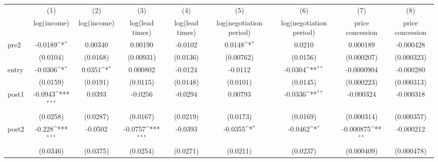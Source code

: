 {
\def\sym#1{\ifmmode^{#1}\else\(^{#1}\)\fi}
\begin{tabular}{l*{8}{c}}
\toprule
            &\multicolumn{1}{c}{(1)}&\multicolumn{1}{c}{(2)}&\multicolumn{1}{c}{(3)}&\multicolumn{1}{c}{(4)}&\multicolumn{1}{c}{(5)}&\multicolumn{1}{c}{(6)}&\multicolumn{1}{c}{(7)}&\multicolumn{1}{c}{(8)}\\
            &\multicolumn{1}{c}{log(income)}&\multicolumn{1}{c}{log(income)}&\multicolumn{1}{c}{log(lead times)}&\multicolumn{1}{c}{log(lead times)}&\multicolumn{1}{c}{log(negotiation period)}&\multicolumn{1}{c}{log(negotiation period)}&\multicolumn{1}{c}{price concession}&\multicolumn{1}{c}{price concession}\\
\midrule
pre2        &     -0.0189\sym{*}  &     0.00340         &     0.00190         &     -0.0102         &      0.0148\sym{*}  &      0.0210         &    0.000189         &   -0.000428         \\
            &    (0.0104)         &    (0.0168)         &   (0.00931)         &    (0.0136)         &   (0.00762)         &    (0.0156)         &  (0.000207)         &  (0.000323)         \\
\addlinespace
entry       &     -0.0306\sym{*}  &      0.0351\sym{*}  &    0.000802         &     -0.0124         &     -0.0112         &     -0.0304\sym{**} &  -0.0000904         &   -0.000280         \\
            &    (0.0159)         &    (0.0191)         &    (0.0115)         &    (0.0148)         &    (0.0101)         &    (0.0145)         &  (0.000223)         &  (0.000313)         \\
\addlinespace
post1       &     -0.0943\sym{***}&      0.0393         &     -0.0256         &     -0.0294         &     0.00793         &     -0.0336\sym{**} &   -0.000324         &   -0.000318         \\
            &    (0.0258)         &    (0.0287)         &    (0.0167)         &    (0.0219)         &    (0.0173)         &    (0.0169)         &  (0.000314)         &  (0.000357)         \\
\addlinespace
post2       &      -0.228\sym{***}&     -0.0502         &     -0.0757\sym{***}&     -0.0393         &     -0.0355\sym{*}  &     -0.0462\sym{*}  &   -0.000875\sym{**} &   -0.000212         \\
            &    (0.0346)         &    (0.0375)         &    (0.0254)         &    (0.0271)         &    (0.0211)         &    (0.0237)         &  (0.000409)         &  (0.000478)         \\

\end{tabular}}
